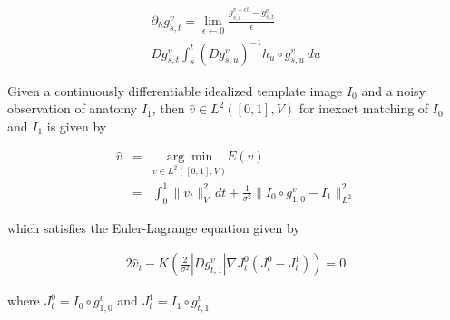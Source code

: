 \documentclass[final, paper=letter,5p,times,twocolumn]{elsarticle}
\theoremstyle{definition}
\begin{document}
\begin{equation*}
\begin{array}{lcl}
\partial_{h} g_{s,t}^{v} = \underset{\epsilon \leftarrow 0}{\lim} \frac{g_{s,t}^{v + \epsilon h} - g_{s,t}^{v}}{\epsilon}\\
D g_{s,t}^{v} \int_{s}^{t} \left( D g_{s,u}^{v} \right)^{-1} h_{u} \circ g_{s,u}^{v} \, du
\end{array}
\end{equation*}

Given a continuously differentiable idealized template image $I_{0}$ and a noisy observation of anatomy $I_{1}$, then $\hat{v} \in L^{2}([0,1],V)$ for inexact matching of $I_{0}$ and $I_{1}$ is given by

\begin{equation*}
\begin{array}{rcl}
\hat{v} & = &  \underset{v \in L^{2}([0,1],V)}{\arg\min} E(v)\\
& = & \int_{0}^{1} \| v_{t} \|_{V}^{2}\, dt + \frac{1}{\sigma^{2}} \| I_{0} \circ g_{1,0}^{v} - I_{1}\|_{L^{2}}^{2}
\end{array}
\end{equation*}

which satisfies the Euler-Lagrange equation given by

\begin{equation}
\begin{array}{rcl}
2\hat{v}_{t} - K \left( \frac{2}{\sigma^{2}} |D g_{t,1}^{\hat{v}}| \nabla J_{t}^{0}(J_{t}^{0} - J_{t}^{1}) \right) = 0
\end{array}
\end{equation}

where $J_{t}^{0} = I_{0} \circ g_{1,0}^{v}$ and $J_{t}^{1} = I_{1} \circ g_{t,1}^{v}$
\end{document}
